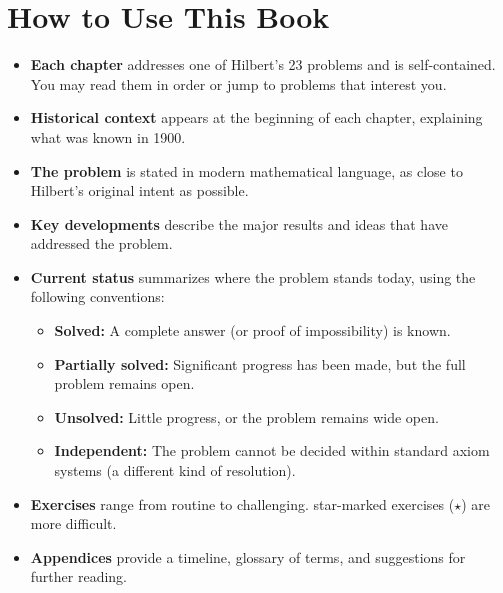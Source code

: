 \chapter*{How to Use This Book}

\begin{itemize}
    \item \textbf{Each chapter} addresses one of Hilbert's 23 problems and is self-contained. You may read them in order or jump to problems that interest you.

    \item \textbf{Historical context} appears at the beginning of each chapter, explaining what was known in 1900.

    \item \textbf{The problem} is stated in modern mathematical language, as close to Hilbert's original intent as possible.

    \item \textbf{Key developments} describe the major results and ideas that have addressed the problem.

    \item \textbf{Current status} summarizes where the problem stands today, using the following conventions:
    \begin{itemize}
        \item \textbf{Solved:} A complete answer (or proof of impossibility) is known.
        \item \textbf{Partially solved:} Significant progress has been made, but the full problem remains open.
        \item \textbf{Unsolved:} Little progress, or the problem remains wide open.
        \item \textbf{Independent:} The problem cannot be decided within standard axiom systems (a different kind of resolution).
    \end{itemize}

    \item \textbf{Exercises} range from routine to challenging. star-marked exercises ($\star$) are more difficult.

    \item \textbf{Appendices} provide a timeline, glossary of terms, and suggestions for further reading.
\end{itemize}
